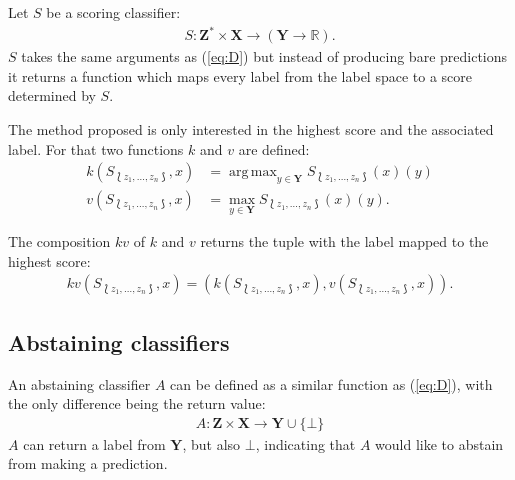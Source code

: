 \documentclass[twoside,11pt]{article}
\DeclareMathOperator*{\argmax}{arg\,max}
\def\ds{\Lbag z_1,\dots,z_n \Rbag}
\begin{document}
Let $S$ be a scoring classifier:
\begin{align}
  \label{eq:S}
  S: \textbf{Z}^* \times \textbf{X} \rightarrow
     (\textbf{Y} \rightarrow \mathbb{R}).
\end{align}
$S$ takes the same arguments as (\ref{eq:D}) but instead
of producing bare predictions it returns a function which
maps every label from the label space to a score
determined by $S$.

The method proposed is only interested in the highest
score and the associated label. For that two functions
$k$ and $v$ are defined:
\begin{align*}
  k(S_{\ds}, x) &= \argmax_{y \in \textbf{Y}}
    S_{\ds}(x)(y) \\
  v(S_{\ds}, x) &= \max_{y \in \textbf{Y}}
    S_{\ds}(x)(y).
\end{align*}

The composition $kv$ of $k$ and $v$ returns the tuple with
the label mapped to the highest score:
\begin{align}
  \label{eq:kv}
  kv(S_{\ds}, x) = (k(S_{\ds}, x), v(S_{\ds}, x)).
\end{align}

\subsection{Abstaining classifiers}

An abstaining classifier $A$ can be defined as a similar
function as (\ref{eq:D}), with the only difference being
the return value:
\begin{align*}
  A: \textbf{Z} \times \textbf{X} \rightarrow
      \textbf{Y} \cup \{\bot\}
\end{align*}
$A$ can return a label from $\textbf{Y}$, but also $\bot$,
indicating that $A$ would like to abstain from making a
prediction.
\end{document}
